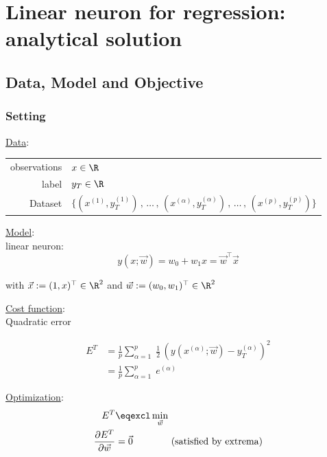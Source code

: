 \section{Linear neuron for regression: analytical solution}

\subsection{Data, Model and Objective}

\begin{frame}\frametitle{Setting}

\underline{Data}:\\

\begin{table}[h]
\begin{tabular}{rl}
observations & $x \in \R$ \\
label         & $y_{T} \in \R$ \\
Dataset       & 
$
\Big\{
	\left(x^{(1)}, y_T^{(1)} 
	\right)
	\,,\, \ldots \,,\,
	\left( x^{(\alpha)}, y_T^{(\alpha)} \right)
	\,,\, \ldots \,,\, 
	\left( x^{(p)}, y_T^{(p)} \right) 
\Big\}
$
\end{tabular}
\end{table}

\pause

\underline{Model}:\\

linear neuron:
\begin{equation}
    y(x; \vec w) = w_{0} + w_{1} x = \vec w^{\top} \vec x
\end{equation}

with $\vec x := (1, x)^{\top} \in \R^{2}$ and $\vec w := (w_{0}, w_{1})^{\top} \in \R^{2}$

\end{frame}

\begin{frame}

\underline{Cost function}:\\

Quadratic error

\begin{align}
E^{T} &= \frac{1}{p} \sum_{\alpha=1}^{p} \;
\frac{1}{2} \, \left( y(x^{(\alpha)}; \vec w)- y^{(\alpha)}_{T}\right)^{2}\\
&= \frac{1}{p} \sum_{\alpha=1}^{p}
\;e^{(\alpha)}
\end{align}


\pause

\underline{Optimization}:\\

\begin{align}
E^{T} &\eqexcl \min_{\vec w}\\
\frac{\partial E^{T}}{\partial \vec w} &= \vec 0 \qquad\qquad \text{(satisfied by extrema)}
\label{eq:extremacond}
\end{align}
    
\end{frame}

